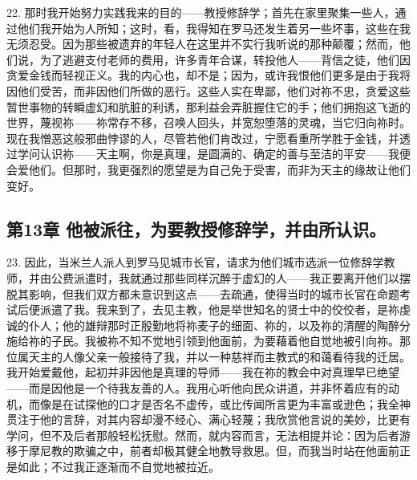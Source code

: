 22. 那时我开始努力实践我来的目的——教授修辞学；首先在家里聚集一些人，通过他们我开始为人所知；这时，看，我得知在罗马还发生着另一些坏事，这些在我无须忍受。因为那些被遗弃的年轻人在这里并不实行我听说的那种颠覆；然而，他们说，为了逃避支付老师的费用，许多青年合谋，转投他人——背信之徒，他们因贪爱金钱而轻视正义。我的内心也，却不是；因为，或许我恨他们更多是由于我将因他们受苦，而非因他们所做的恶行。这些人实在卑鄙，他们对祢不忠，贪爱这些暂世事物的转瞬虚幻和肮脏的利诱，那利益会弄脏握住它的手；他们拥抱这飞逝的世界，蔑视祢——祢常存不移，召唤人回头，并宽恕堕落的灵魂，当它归向祢时。现在我憎恶这般邪曲悖谬的人，尽管若他们肯改过，宁愿看重所学胜于金钱，并透过学问认识祢——天主啊，你是真理，是圆满的、确定的善与至洁的平安——我便会爱他们。但那时，我更强烈的愿望是为自己免于受害，而非为天主的缘故让他们变好。\par


\subsection{第13章 他被派往，为要教授修辞学，并由所认识。}

23. 因此，当米兰人派人到罗马见城市长官，请求为他们城市选派一位修辞学教师，并由公费派遣时，我就通过那些同样沉醉于虚幻的人——我正要离开他们以摆脱其影响，但我们双方都未意识到这点——去疏通，使得当时的城市长官在命题考试后便派遣了我。我来到了，去见主教，他是举世知名的贤士中的佼佼者，是祢虔诚的仆人；他的雄辩那时正殷勤地将祢麦子的细面、祢的，以及祢的清醒的陶醉分施给祢的子民。我被祢不知不觉地引领到他面前，为要藉着他自觉地被引向祢。那位属天主的人像父亲一般接待了我，并以一种慈祥而主教式的和蔼看待我的迁居。我开始爱戴他，起初并非因他是真理的导师——我在祢的教会中对真理早已绝望——而是因他是一个待我友善的人。我用心听他向民众讲道，并非怀着应有的动机，而像是在试探他的口才是否名不虚传，或比传闻所言更为丰富或逊色；我全神贯注于他的言辞，对其内容却漫不经心、满心轻蔑；我欣赏他言说的美妙，比更有学问，但不及后者那般轻松抚慰。然而，就内容而言，无法相提并论：因为后者游移于摩尼教的欺骗之中，前者却极其健全地教导救恩。但，而我当时站在他面前正是如此；不过我正逐渐而不自觉地被拉近。\par


